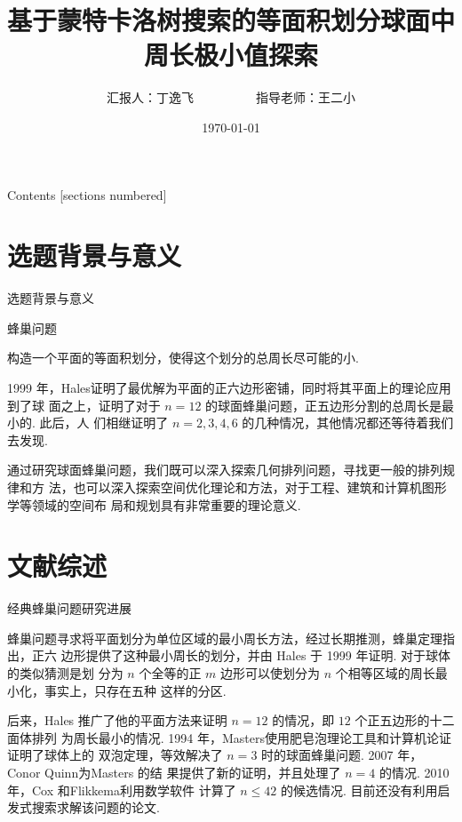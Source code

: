 \documentclass[12pt,aspectratio=169]{beamer}
\title{基于蒙特卡洛树搜索的等面积划分球面中周长极小值探索}
\date{\today}
\author{汇报人：丁逸飞\ \ \ \ \ \ \ \ \ \ 指导老师：王二小}
\begin{document}
\maketitle
\footnotesize
\begin{frame}{Contents}
  [sections numbered]
  \tableofcontents%
\end{frame}

\section{选题背景与意义}

\begin{frame}{选题背景与意义}

  \begin{block}{蜂巢问题}

    构造一个平面的等面积划分，使得这个划分的总周长尽可能的小. 

  \end{block}

  1999 年，Hales\cite{hales2001honeycomb}证明了最优解为平面的正六边形密铺，同时将其平面上的理论应用到了球
  面之上，证明了对于 $n = 12$ 的球面蜂巢问题，正五边形分割的总周长是最小的. 此后，人
  们相继证明了 $n = 2, 3, 4, 6$ 的几种情况，其他情况都还等待着我们去发现. 

  通过研究球面蜂巢问题，我们既可以深入探索几何排列问题，寻找更一般的排列规律和方
  法，也可以深入探索空间优化理论和方法，对于工程、建筑和计算机图形学等领域的空间布
  局和规划具有非常重要的理论意义. 

\end{frame}

\section{文献综述}

\begin{frame}{经典蜂巢问题研究进展}

  蜂巢问题寻求将平面划分为单位区域的最小周长方法，经过长期推测，蜂巢定理指出，正六
  边形提供了这种最小周长的划分，并由 Hales 于 1999 年证明\cite{hales2001honeycomb}. 对于球体的类似猜测是划
  分为 $n$ 个全等的正 $m$ 边形可以使划分为 $n$ 个相等区域的周长最小化，事实上，只存在五种
  这样的分区. 

  后来，Hales 推广了他的平面方法来证明 $n = 12$ 的情况，即 $12$ 个正五边形的十二面体排列
  为周长最小的情况. 1994 年，Masters\cite{masters1996perimeter}使用肥皂泡理论工具和计算机论证证明了球体上的
  双泡定理，等效解决了 $n = 3$ 时的球面蜂巢问题. 2007 年，Conor Quinn\cite{quinn2007least}为Masters 的结
  果提供了新的证明，并且处理了 $n = 4$ 的情况. 2010 年，Cox 和Flikkema\cite{cox2010minimal}利用数学软件
  计算了 $n \leq 42$ 的候选情况. 目前还没有利用启发式搜索求解该问题的论文. 

\end{frame}
\end{document}
